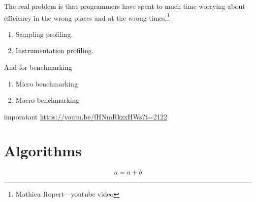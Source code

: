 \documentclass[a4paper]{article}
\begin{document}
The real problem is that programmers have spent to much time worrying about efficiency in the wrong places and at the wrong times.\footnote{Mathieu Ropert---youtube video}

\begin{enumerate}
    \item Sampling profiling.
    \item Instrumentation profiling.
\end{enumerate}

And for benchmarking

\begin{enumerate}
    \item Micro benchmarking
    \item Macro benchmarking
\end{enumerate}

imporatant \url{https://youtu.be/fHNmRkzxHWs?t=2122}

\section*{Algorithms}

\[
    a = a + b
\]
\end{document}
